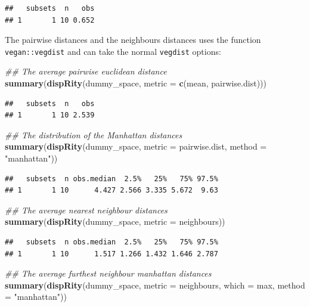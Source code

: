\documentclass[
]{book}
\newenvironment{Shaded}{\begin{snugshade}}{\end{snugshade}}
\newcommand{\CommentTok}[1]{\textcolor[rgb]{0.56,0.35,0.01}{\textit{#1}}}
\newcommand{\DataTypeTok}[1]{\textcolor[rgb]{0.13,0.29,0.53}{#1}}
\newcommand{\KeywordTok}[1]{\textcolor[rgb]{0.13,0.29,0.53}{\textbf{#1}}}
\newcommand{\NormalTok}[1]{#1}
\newcommand{\StringTok}[1]{\textcolor[rgb]{0.31,0.60,0.02}{#1}}
\begin{document}
\begin{verbatim}
##   subsets  n   obs
## 1       1 10 0.652
\end{verbatim}

The pairwise distances and the neighbours distances uses the function \texttt{vegan::vegdist} and can take the normal \texttt{vegdist} options:

\begin{Shaded}
\begin{Highlighting}[]
\CommentTok{\#\# The average pairwise euclidean distance}
\KeywordTok{summary}\NormalTok{(}\KeywordTok{dispRity}\NormalTok{(dummy\_space, }\DataTypeTok{metric =} \KeywordTok{c}\NormalTok{(mean, pairwise.dist)))}
\end{Highlighting}
\end{Shaded}

\begin{verbatim}
##   subsets  n   obs
## 1       1 10 2.539
\end{verbatim}

\begin{Shaded}
\begin{Highlighting}[]
\CommentTok{\#\# The distribution of the Manhattan distances}
\KeywordTok{summary}\NormalTok{(}\KeywordTok{dispRity}\NormalTok{(dummy\_space, }\DataTypeTok{metric =}\NormalTok{ pairwise.dist,}
                 \DataTypeTok{method =} \StringTok{"manhattan"}\NormalTok{))}
\end{Highlighting}
\end{Shaded}

\begin{verbatim}
##   subsets  n obs.median  2.5%   25%   75% 97.5%
## 1       1 10      4.427 2.566 3.335 5.672  9.63
\end{verbatim}

\begin{Shaded}
\begin{Highlighting}[]
\CommentTok{\#\# The average nearest neighbour distances}
\KeywordTok{summary}\NormalTok{(}\KeywordTok{dispRity}\NormalTok{(dummy\_space, }\DataTypeTok{metric =}\NormalTok{ neighbours))}
\end{Highlighting}
\end{Shaded}

\begin{verbatim}
##   subsets  n obs.median  2.5%   25%   75% 97.5%
## 1       1 10      1.517 1.266 1.432 1.646 2.787
\end{verbatim}

\begin{Shaded}
\begin{Highlighting}[]
\CommentTok{\#\# The average furthest neighbour manhattan distances}
\KeywordTok{summary}\NormalTok{(}\KeywordTok{dispRity}\NormalTok{(dummy\_space, }\DataTypeTok{metric =}\NormalTok{ neighbours,}
                 \DataTypeTok{which =}\NormalTok{ max, }\DataTypeTok{method =} \StringTok{"manhattan"}\NormalTok{))}
\end{Highlighting}
\end{Shaded}
\end{document}
